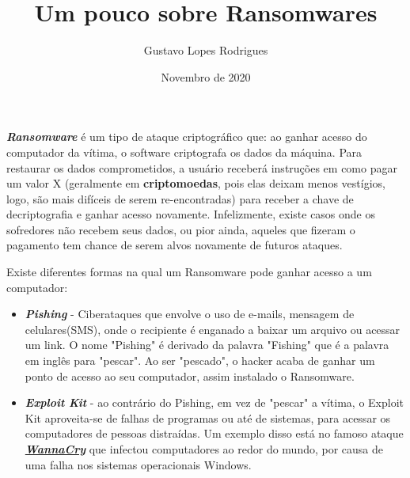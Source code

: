 \documentclass[12pt]{article}
\title{\textbf{Um pouco sobre Ransomwares}}
\author{Gustavo Lopes Rodrigues}
\date{Novembro de 2020}
\begin{document}
    
    \maketitle

    \textbf{\emph{Ransomware}} é um tipo de ataque criptográfico
    que: ao ganhar acesso do computador da vítima, o software 
    criptografa os dados da máquina. Para restaurar os dados comprometidos,
    a usuário receberá instruções em como pagar um valor X
    (geralmente em \textbf{criptomoedas}, pois elas deixam menos 
    vestígios, logo, são mais difíceis de serem re-encontradas) 
    para receber a chave de decriptografia e ganhar acesso novamente. 
    Infelizmente, existe casos onde os sofredores não recebem seus dados, 
    ou pior ainda, aqueles que fizeram o pagamento tem chance de
    serem alvos novamente de futuros ataques.

    Existe diferentes formas na qual um Ransomware pode ganhar 
    acesso a um computador:

    \begin{itemize}
        \item \textbf{\emph{Pishing}} - Ciberataques que envolve
        o uso de e-mails, mensagem de celulares(SMS), onde o recipiente
        é enganado a baixar um arquivo ou acessar um link. O nome "Pishing" é 
        derivado da palavra "Fishing" que é a palavra em inglês para "pescar".
        Ao ser "pescado", o hacker acaba de ganhar um ponto de acesso ao seu 
        computador, assim instalado o Ransomware.
    
        \item \textbf{\emph{Exploit Kit}} - ao contrário do Pishing, em vez
        de "pescar" a vítima, o Exploit Kit aproveita-se de falhas de programas
        ou até de sistemas, para acessar os computadores de pessoas distraídas.
        Um exemplo disso está no famoso ataque \href{https://olhardigital.com.br/especial/wannacry/}{\textbf{\emph{WannaCry}}} 
        que infectou computadores ao redor do mundo, por causa de uma falha nos 
        sistemas operacionais Windows.
    \end{itemize}
\end{document}
